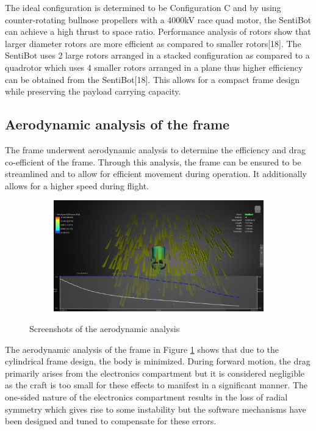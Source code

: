 \documentclass[12pt]{article}
\begin{document}
The ideal configuration is determined to be Configuration C and by using counter-rotating bullnose propellers with a 4000kV race quad motor, the SentiBot can achieve a high thrust to space ratio. Performance analysis of rotors show that larger diameter rotors are more efficient as compared to smaller rotors[18]. The SentiBot uses 2 large rotors arranged in a stacked configuration as compared to a quadrotor which uses 4 smaller rotors arranged in a plane thus higher efficiency can be obtained from the SentiBot[18]. This allows for a compact frame design while preserving the payload carrying capacity.

\subsection{Aerodynamic analysis of the frame}
The frame underwent aerodynamic analysis to determine the efficiency and drag co-efficient of the frame. Through this analysis, the frame can be ensured to be streamlined and to allow for efficient movement during operation. It additionally allows for a higher speed during flight.

\begin{figure}[h]
	\centering
	\begin{subfigure}{0.5\textwidth}
		\centering
		\includegraphics[width=0.9\linewidth]{aerodynamic-1.png}
	\end{subfigure}
	\caption{Screenshots of the aerodynamic analysis}
	\label{fig:aerodynamic}
\end{figure}

The aerodynamic analysis of the frame in Figure \ref{fig:aerodynamic} shows that due to the cylindrical frame design, the body is minimized. During forward motion, the drag primarily arises from the electronics compartment but it is considered negligible as the craft is too small for these effects to manifest in a significant manner. The one-sided nature of the electronics compartment results in the loss of radial symmetry which gives rise to some instability but the software mechanisms have been designed and tuned to compensate for these errors. 
\end{document}
